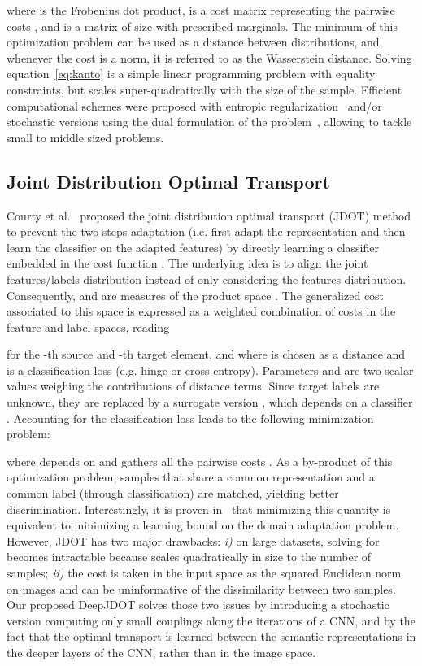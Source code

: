 \documentclass[runningheads]{llncs}
\begin{document}
 where  is the Frobenius dot product,  is a cost matrix  representing the pairwise costs , and  is a matrix of size  with prescribed marginals. The minimum of this optimization problem can be used as a distance between distributions, and, whenever the cost  is a norm, it is referred to as the Wasserstein distance. Solving equation~\eqref{eq:kanto} is a simple linear programming problem with equality constraints, but scales super-quadratically with the size of the sample. Efficient computational schemes were proposed with entropic regularization~\cite{Cuturi13} and/or stochastic versions using the dual formulation of the problem~\cite{genevay2016,arjovsky17,seguy2018}, allowing to tackle small to middle sized problems. 

\subsection{Joint Distribution Optimal Transport}
Courty et al.~\cite{courty2017joint} proposed the joint distribution optimal transport (JDOT) method to prevent the two-steps adaptation (i.e. first adapt the representation and then learn the classifier on the adapted features) by directly learning a classifier embedded in the cost function . The underlying idea is to align the joint features/labels distribution instead of only considering the features distribution. Consequently,  and  are measures of the product space . The generalized cost associated to this space is expressed as a weighted combination of costs in the feature and label spaces, reading
 
 for the -th source and -th target element, and where  is chosen as a  distance and  is a classification loss (e.g. hinge or cross-entropy). Parameters  and  are two scalar values weighing the contributions of distance terms. Since target labels  are unknown, they are replaced by a surrogate version , which depends on a classifier . Accounting for the classification loss leads to the following minimization problem:
 
 where   depends on  and gathers all the pairwise costs . As a by-product of this optimization problem, samples that share a common representation and a common label (through classification) are matched, yielding better discrimination. Interestingly, it is proven in~\cite{courty2017joint} that minimizing this quantity is equivalent to minimizing a learning bound on the domain adaptation problem. However, JDOT has two major drawbacks: {\em i)} on large datasets, solving for  becomes intractable because  scales quadratically in size to the number of samples; {\em ii)} the cost  is taken in the input space as the squared Euclidean norm on images and can be uninformative of the dissimilarity between two samples. Our proposed DeepJDOT solves those two issues by introducing a stochastic version computing only small couplings along the iterations of a CNN, and by the fact that the optimal transport is learned between the semantic representations in the deeper layers of the CNN, rather than in the image space. 
\end{document}
